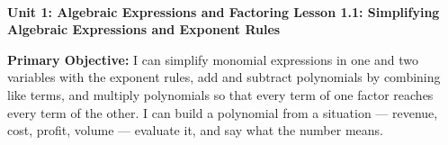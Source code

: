 \documentclass[10pt]{article}
\newcommand{\UnitNumberName}{Unit 1: Algebraic Expressions and Factoring \quad}
\newcommand{\LessonNumberName}{Lesson 1.1: Simplifying Algebraic Expressions and Exponent Rules}
\begin{document}
\begin{center}
    {\Large\bfseries \CourseName \\
    {\small\bfseries \UnitNumberName \LessonNumberName}}
\end{center}

\begin{tcolorbox}[colback=mist, colframe=royal, boxrule=0.9pt, arc=2mm,
    left=2mm, right=2mm, top=1.5mm, bottom=1.5mm]
    \textbf{Primary Objective:} I can simplify monomial expressions in one and two variables with
    the exponent rules, add and subtract polynomials by combining like terms, and multiply
    polynomials so that every term of one factor reaches every term of the other. I can build a
    polynomial from a situation --- revenue, cost, profit, volume --- evaluate it, and say what
    the number means.
\end{tcolorbox}
\end{document}
